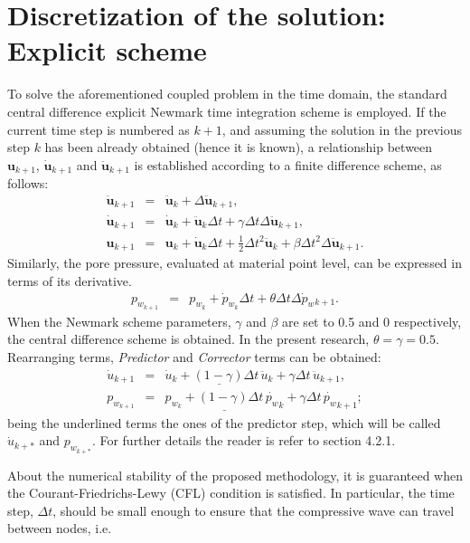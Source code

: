 \documentclass[twocolumn]{svjour3}          %
\begin{document}
\section{Discretization of the solution: Explicit scheme}
\label{sec:4}
To solve the aforementioned coupled problem in the time domain, the standard central difference explicit Newmark time integration scheme is employed. If the current time step is numbered as $k+1$, and assuming the solution in the previous step $k$ has been already obtained (hence it is known), a relationship between $\textbf{u}_{k+1}$, $\dot{\textbf{u}}_{k+1}$ and $\ddot{\textbf{u}}_{k+1}$ is established according to a finite difference scheme, as follows: 
\begin{eqnarray}
\ddot{\boldsymbol{u}}_{k+1} &=&\ddot{\boldsymbol{u}}_{k}+\Delta \ddot{\boldsymbol{u}}_{k+1},  \nonumber \\
\dot{\boldsymbol{u}}_{k+1} &=&\dot{\boldsymbol{u}}_k+\ddot{\boldsymbol{u}}_{k}\Delta t+\gamma \Delta t \Delta \ddot{\boldsymbol{u}}_{k+1}, \nonumber \\
\boldsymbol{u}_{k+1}&=&\boldsymbol{u}_{k}+\dot{\boldsymbol{u}}_{k} \Delta t+\frac{1}{2} \Delta t^{2} \ddot{\boldsymbol{u}}_{k}+\beta\Delta t^{2}\Delta \ddot{\boldsymbol{u}}_{k+1}. \label{eq_Nw}
\end{eqnarray}
Similarly, the pore pressure, evaluated at material point level, can be expressed in terms of its derivative.
\begin{eqnarray}
p_{w_{k+1}} &=&p_{w_k}+\dot{p}_{w_k}\Delta t+\theta \Delta t \Delta \dot{p}_w{_{k+1}}.  \label{eq_Nw_p}
\end{eqnarray}
When the Newmark scheme parameters, $\gamma$ and $\beta$ are set to 0.5 and 0 respectively, the central difference scheme is obtained. In the present research, $\theta=\gamma=0.5$. Rearranging terms, \textit{Predictor} and \textit{Corrector} terms can be obtained:
\begin{eqnarray}
\dot{u}_{k+1}&=&\underline{\dot{u}_{k}+(1-\gamma)\Delta t \,  \ddot{u}_{k}} + \gamma \Delta t \,  \ddot{u}_{k+1} \label{pc_1}, \\
p_{w_{k+1}}&=&\underline{p_{w_{k}}+(1-\gamma)\Delta t \,  \dot{p_w}_{k}} + \gamma \Delta t \,  \dot{p_w}_{k+1} \label{pc_2};
\end{eqnarray}
being the underlined terms the ones of the predictor step, which will be called $\dot{u}_{k+*}$ and $p_{w_{k+*}}$. For further details the reader is refer to section 4.2.1.

About the numerical stability of the proposed methodology, it is guaranteed when the Courant-Friedrichs-Lewy (CFL) condition is satisfied. In particular, the time step, $\Delta t$, should be small enough to ensure that the compressive wave can travel between nodes, i.e. 
\end{document}
